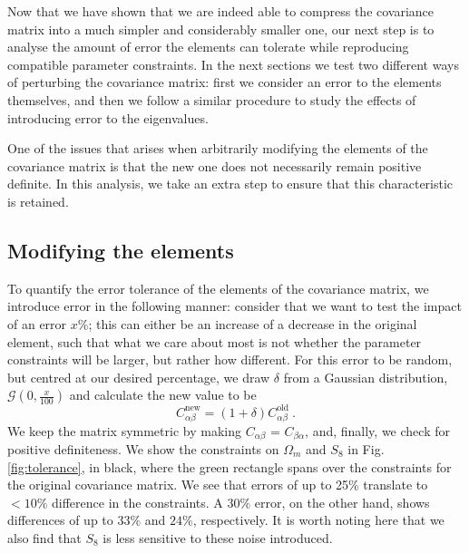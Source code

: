 \documentclass[twocolumn]{\docclass}
\newcommand{\rf}[1]{\ref{fig:#1}}
\newcommand\be{\begin{equation}}
\newcommand\ee{\end{equation}}
\begin{document}
	Now that we have shown that we are indeed able to compress the covariance matrix into a much simpler and considerably smaller one, our next step is to analyse the amount of error the elements can tolerate while reproducing compatible parameter constraints. In the next sections we test two different ways of perturbing the covariance matrix: first we consider an error to the elements themselves, and then we follow a similar procedure to study the effects of introducing error to the eigenvalues.
	
	One of the issues that arises when arbitrarily modifying the elements of the covariance matrix is that the new one does not necessarily remain positive definite. In this analysis, we take an extra step to ensure that this characteristic is retained.
	
	\subsection{Modifying the elements}
	
	To quantify the error tolerance of the elements of the covariance matrix, we introduce error in the following manner: consider that we want to test the impact of an error $x \%$; this can either be an increase of a decrease in the original element, such that what we care about most is not whether the parameter constraints will be larger, but rather how different. For this error to be random, but centred at our desired percentage, we draw $\delta$ from a Gaussian distribution, $\mathcal{G}(0,\frac{x}{100})$ and calculate the new value to be
	\be \label{eq:tolerance}
	C_{\alpha \beta}^{\mathrm{new}} = (1 + \delta)C_{\alpha \beta}^{\mathrm{old}}\ .
	\ee
	We keep the matrix symmetric by making $C_{\alpha \beta}$ = $C_{\beta \alpha}$, and, finally, we check for positive definiteness. We show the constraints on $\Omega_m$ and $S_8$ in Fig. \rf{tolerance}, in black, where the green rectangle spans over the constraints for the original covariance matrix. We see that errors of up to 25\% translate to $< 10\%$ difference in the constraints. A $30\%$ error, on the other hand, shows differences of up to $33\%$ and $24\%$, respectively. It is worth noting here that we also find that $S_8$ is less sensitive to these noise introduced.
	
\end{document}
